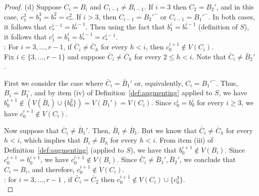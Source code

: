 \documentclass[12pt,reqno,a4paper]{amsart}
\begin{document}
\begin{proof}
(d) Suppose $C_i=B_i$ and $C_{i-1}\neq B_{i-1}$. If $i=3$ then
$C_2=B_2'$, and in this case, $c_1^3=b_1^3 = b_*^2=c_*^2$. If $i>3$,
then $C_{i-1} = B_2'^-$ or $C_{i-1}=B_1'^-$. In both cases, it follows
that $c_*^{i-1} = b_* ^{i-1}$. Then using the fact that $b_1^i=
b_*^{i-1}$ (definition of $S$), it follows that $c_1^i=b_1^i=
b_*^{i-1}=c_*^{i-1}$. \\ 


: For $i=3,\ldots, r-1$,  if
\(\bar C_i \neq \bar C_h\) for every $h<i$,  then $c_0^{i+1} \notin V(C_i)$. \\


Fix $i\in\{3, \ldots, r-1\}$ and suppose \(\bar C_i \neq \bar C_{h}\) 
for every \(2\leq h < i\).
Note that $\bar C_i\neq \bar B_2'$.

First we consider the case where $\bar C_i=\bar B_1'$
or, equivalently, \(C_i = B_1'^-\).
Thus, \(B_i = B_1^-\),
and by item (iv) of Definition~\ref{def:augmenting} applied to \(S\), we have 
\(b_0^{i+1}\notin (V(\bar B_i)\cup\{b_0^2\}) =V(B_1')=V(C_i)\).
Since \(c_0^i = b_0^i\) for every \(i\geq 3\), we have \(c_0^{i+1}\notin 
V(C_i)\).

Now suppose that \(\bar C_i\neq \bar B_1'\).
Then, \(\bar B_i \neq \bar B_1\).
But we know that \(\bar C_i \neq \bar C_{h}\)
for every \( h < i\),
which implies that \(B_i \neq B_{h}\)
for every \(h <i\).
From item (iii) of Definition~\ref{def:augmenting} (applied to \(S\)),
we have that \(b_0^{i+1}\notin V(B_i)\).
Since \(c_0^{i+1}=b_0^{i+1}\),
we have \(c_0^{i+1}\notin V(B_i)\).
Since \(\bar C_i \neq \bar B_1', \bar B_2'\),
we conclude that \(C_i = B_i\), and therefore, \(c_0^{i+1}\notin V(C_i)\). \\


: for \(i=3,\ldots,r-1\) , if 
 \(\bar C_i = \bar C_2\) then \(c_0^{i+1}\notin V(C_i)\cup\{c_0^3\}\).\\


\end{proof}
\end{document}
